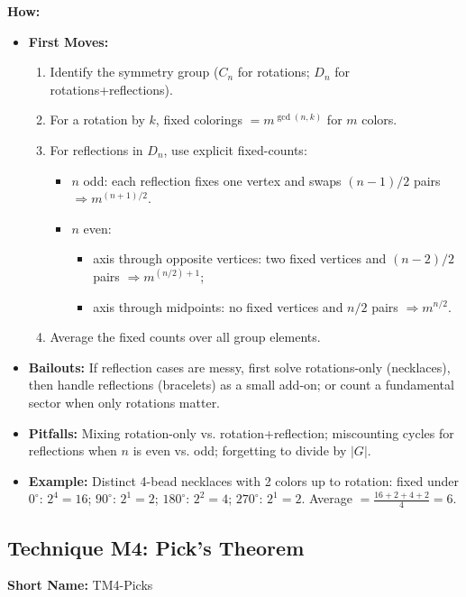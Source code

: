 \documentclass[12pt]{article}
\begin{document}
\textbf{How:}
\begin{itemize}
    \item \textbf{First Moves:}
    \begin{enumerate}[nosep]
        \item Identify the symmetry group ($C_n$ for rotations; $D_n$ for rotations+reflections).
        \item For a rotation by $k$, fixed colorings $= m^{\gcd(n,k)}$ for $m$ colors.
        \item For reflections in $D_n$, use explicit fixed-counts:
        \begin{itemize}
            \item $n$ odd: each reflection fixes one vertex and swaps $(n-1)/2$ pairs $\Rightarrow m^{(n+1)/2}$.
            \item $n$ even:
            \begin{itemize}
                \item axis through opposite vertices: two fixed vertices and $(n-2)/2$ pairs $\Rightarrow m^{(n/2)+1}$;
                \item axis through midpoints: no fixed vertices and $n/2$ pairs $\Rightarrow m^{n/2}$.
            \end{itemize}
        \end{itemize}
        \item Average the fixed counts over all group elements.
    \end{enumerate}
    \item \textbf{Bailouts:} If reflection cases are messy, first solve rotations-only (necklaces), then handle reflections (bracelets) as a small add-on; or count a fundamental sector when only rotations matter.
    \item \textbf{Pitfalls:} Mixing rotation-only vs. rotation+reflection; miscounting cycles for reflections when $n$ is even vs. odd; forgetting to divide by $|G|$.
    \item \textbf{Example:} Distinct 4-bead necklaces with 2 colors up to rotation: fixed under $0^\circ$: $2^4=16$; $90^\circ$: $2^1=2$; $180^\circ$: $2^2=4$; $270^\circ$: $2^1=2$. Average $=\tfrac{16+2+4+2}{4}=6$.
\end{itemize}

\subsection{Technique M4: Pick's Theorem}
\textbf{Short Name:} TM4-Picks
\end{document}

